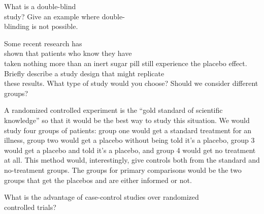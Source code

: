 \documentclass[11pt, chapterprefix=true]{scrbook}\usepackage[]{graphicx}\usepackage[]{color}
\begin{document}
\begin{exercises}
\begin{solution}
	\end{solution}

  \begin{exercise} %

What is a double-blind \\ study?  Give an example where double- \\ blinding is not possible.

    \end{exercise}
% 

  \begin{exercise} %

Some recent research has \\ shown that patients who know they have \\ taken nothing more than an inert sugar pill still experience the placebo effect. Briefly describe a study design that might replicate \\ these results. What type of study would you choose? Should we consider different \\ groups? 
  \end{exercise}
  \begin{solution}  %
  
A randomized controlled experiment is the ``gold standard of scientific knowledge'' so that it would be the best way to study this situation. We would study four groups of patients: group one would get a standard treatment for an illness, group two would get a placebo without being told it's a placebo, group 3 would get a placebo and told it's a placebo, and group 4 would get no treatment at all. This method would, interestingly, give controls both from the standard and no-treatment groups. The groups for primary comparisons would be the two groups that get the placebos and are either informed or not.  

  \end{solution}

  \begin{exercise} %

What is the advantage of case-control studies over randomized \\ controlled trials?

  \end{exercise}
% 


\end{exercises}
\end{document}
